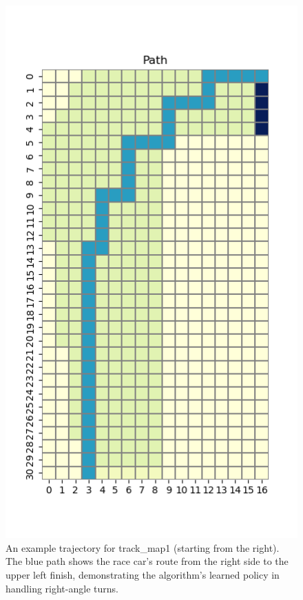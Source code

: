 \documentclass{article}
\begin{document}
\begin{figure}[h]
    \centering
    \begin{minipage}{0.48\textwidth}
        \includegraphics[width=\textwidth]{grid1_3.png}
        \caption{An example trajectory for track\_map1 (starting from the right). The blue path shows the race car's route from the right side to the upper left finish, demonstrating the algorithm's learned policy in handling right-angle turns.}

\end{minipage}
\end{figure}
\end{document}
